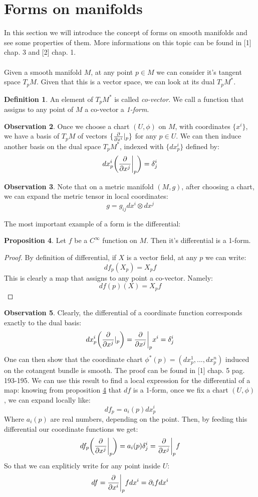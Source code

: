 \documentclass[12pt,a4paper]{report}
\theoremstyle{definition}
\newtheorem{Def}{Definition}[chapter]
\theoremstyle{Theorem}
\newtheorem{Prop}[Def]{Proposition}
\theoremstyle{definition}
\theoremstyle{definition}
\newtheorem{Obs}[Def]{Observation}
\begin{document}
	\section{Forms on manifolds}
	In this section we will introduce the concept of forms on smooth manifolds and see some properties of them. More informations on this topic can be found in [1] chap. 3 and [2] chap. 1.\\
	\\
	Given a smooth manifold $M$, at any point $p\in M$ we can consider it's tangent space $T_pM$. Given that this is a vector space, we can look at its dual $T_pM^*$. 
	\begin{Def}
		An element of $T_pM^*$ is called \textit{co-vector}. We call a function that assigns to any point of $M$ a co-vector a \textit{1-form}.
	\end{Def}
	\begin{Obs}
		Once we choose a chart $(U,\phi)$ on $M$, with coordinates $\{x^i\}$, we have a basis of $T_pM$ of vectors $\{{\partial\over \partial x^i}|_p\}$ for any $p\in U$. We can then induce another basis on the dual space $T_pM^*$, indexed with $\{dx^i_p\}$ defined by:
		$$dx^i_p\bigg({\partial\over \partial x^j}\bigg|_p\bigg)=\delta^i_j$$
	\end{Obs}
	\begin{Obs}
		Note that on a metric manifold $(M,g)$, after choosing a chart, we can expand the metric tensor in local coordinates:
		$$g=g_{ij}dx^i\otimes dx^j$$  
	\end{Obs}
	The most important example of a form is the differential:
	\begin{Prop} \label{df_is_a_form}
		Let $f$ be a $C^\infty$ function on $M$. Then it's differential is a 1-form.
	\end{Prop}
	\begin{proof}
		By definition of differential, if $X$ is a vector field, at any $p$ we can write:
		$$df_p(X_p)=X_pf$$
		This is clearly a map that assigns to any point a co-vector. Namely:
		$$df(p)(X)=X_pf$$
	\end{proof}
	\begin{Obs}
		Clearly, the differential of a coordinate function corresponds exactly to the dual basis:
		$$dx^i_p\bigg({\partial\over \partial x^j}|_p\bigg)={\partial\over \partial x^j}\bigg|_px^i=\delta^i_j$$
		One can then show that the coordinate chart $\phi^*(p)=(dx^1_p,...,dx^n_p)$ induced on the cotangent bundle is smooth. The proof can be found in [1] chap. 5 pag. 193-195.
		We can use this result to find a local expression for the differential of a map:
		knowing from proposition \ref{df_is_a_form} that $df$ is a 1-form, once we fix a chart $(U,\phi)$, we can expand locally like:
		$$df_p=a_i(p)dx^i_p$$
		Where $a_i(p)$ are real numbers, depending on the point.
		Then, by feeding this differential our coordinate functions we get:
		$$df_p\bigg({\partial\over \partial x^j}\bigg|_p\bigg)=a_i(p)\delta^i_j={\partial\over \partial x^j}\bigg|_pf$$
		So that we can expliticly write for any point inside $U$:
		$$df={\partial\over \partial x^i}\bigg|_pfdx^i=\partial_ifdx^i$$
	\end{Obs}
\end{document}
